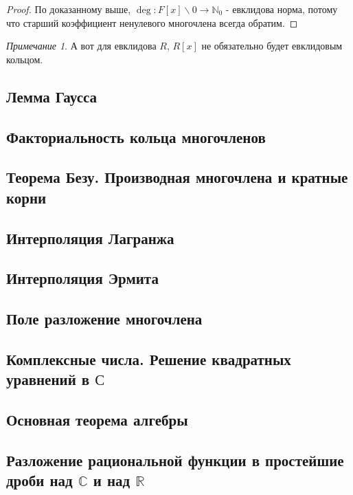 \documentclass[a4paper,100pt]{article}
\theoremstyle{indented}
\theoremstyle{definition}
\theoremstyle{remark}
\newtheorem{remark}{Примечание}
\begin{document}
\begin{proof}
    По доказанному выше, $\deg: F[x]\backslash 0\rightarrow \mathbb{N}_0$ - евклидова норма, потому что старший коэффициент ненулевого многочлена всегда обратим.
\end{proof}

\begin{remark}
    А вот для евклидова $R$, $R[x]$ не обязательно будет евклидовым кольцом.
\end{remark}

\resetall

\subsection{Лемма Гаусса}

\subsection{Факториальность кольца многочленов}

\subsection{Теорема Безу. Производная многочлена и кратные корни}

\subsection{Интерполяция Лагранжа}

\subsection{Интерполяция Эрмита}

\subsection{Поле разложение многочлена}

\subsection{Комплексные числа. Решение квадратных уравнений в $\mathbb{С}$}

\subsection{Основная теорема алгебры}

\subsection{Разложение рациональной функции в простейшие дроби над $\mathbb{C}$ и над $\mathbb{R}$}
\end{document}
